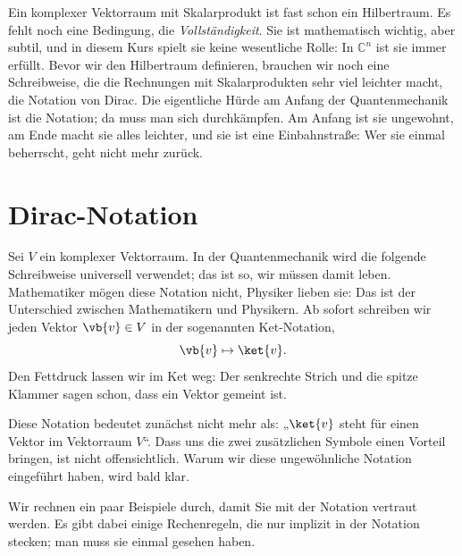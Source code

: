 Ein komplexer Vektorraum mit Skalarprodukt ist fast schon ein Hilbertraum. Es fehlt noch eine
Bedingung, die \emph{Vollständigkeit}. Sie ist mathematisch wichtig, aber subtil, und in
diesem Kurs spielt sie keine wesentliche Rolle: In $\mathbb{C}^n$ ist sie immer
erfüllt. Bevor wir den Hilbertraum definieren, brauchen wir noch eine
Schreibweise, die die Rechnungen mit Skalarprodukten sehr viel leichter macht, die Notation
von Dirac. Die eigentliche Hürde am Anfang der Quantenmechanik ist die Notation; da muss man
sich durchkämpfen. Am Anfang ist sie ungewohnt, am Ende macht sie alles leichter, und sie ist
eine Einbahnstraße: Wer sie einmal beherrscht, geht nicht mehr zurück.

\section{Dirac-Notation}\label{c03.s4}

Sei $V$ ein komplexer Vektorraum. In der Quantenmechanik wird die folgende Schreibweise
universell verwendet; das ist so, wir müssen damit leben. Mathematiker mögen diese Notation
nicht, Physiker lieben sie: Das ist der Unterschied zwischen Mathematikern und Physikern. Ab
sofort schreiben wir jeden Vektor $\vb{v} \in V$ in der sogenannten Ket-Notation,
\begin{equation*}
  \vb{v} \mapsto \ket{v} .
\end{equation*}
Den Fettdruck lassen wir im Ket weg: Der senkrechte Strich und die spitze Klammer sagen schon,
dass ein Vektor gemeint ist.

Diese Notation bedeutet zunächst nicht mehr als: „$\ket{v}$ steht für einen Vektor im
Vektorraum $V$“. Dass uns die zwei zusätzlichen Symbole einen Vorteil bringen, ist nicht
offensichtlich. Warum wir diese ungewöhnliche Notation eingeführt haben, wird bald klar.

Wir rechnen ein paar Beispiele durch, damit Sie mit der Notation vertraut werden. Es gibt
dabei einige Rechenregeln, die nur implizit in der Notation stecken; man muss sie einmal
gesehen haben.

